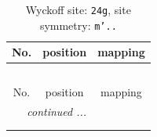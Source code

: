 \documentclass[fleqn,8pt]{jsarticle}
\begin{document}
\renewcommand{\arraystretch}{1.2}
\begin{longtable}{ccc}
\caption{Wyckoff site: {\tt 24g}, site symmetry: {\tt m'..}}
 \\
 \hline \hline
No. & position & mapping \\ \hline \endfirsthead

\multicolumn{2}{l}{\tablename\ \thetable{}} \\
 \hline \hline
No. & position & mapping \\ \hline \endhead

 \hline \hline
\multicolumn{2}{r}{\footnotesize\it continued ...} \\ \endfoot

 \hline \hline
\multicolumn{2}{r}{} \\ \endlastfoot


\end{longtable}
\end{document}
